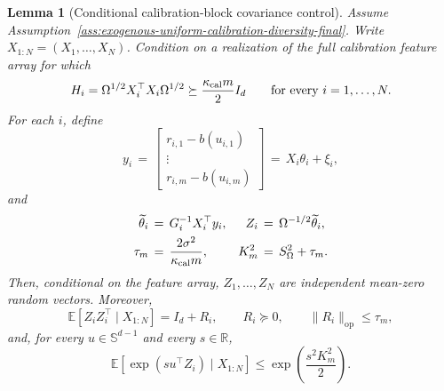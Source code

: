 \documentclass{article} %
\newtheorem{lemma}[theorem]{Lemma}
\begin{document}
\begin{lemma}[Conditional calibration-block covariance control]
\label{lem:calibration-block-covariance-control-final}
Assume Assumption~\ref{ass:exogenous-uniform-calibration-diversity-final}.
Write \(X_{1:N}=(X_1,\ldots,X_N)\).
Condition on a realization of the full calibration feature array for which
\begin{equation}
H_i=\Omega^{1/2}X_i^\top X_i\Omega^{1/2}
\succeq
\frac{\kappa_{\rm cal}m}{2}I_d
\qquad
\text{for every }i=1,\ldots,N.
\end{equation}
For each \(i\), define
\begin{equation}
y_i
\,=\,
\begin{bmatrix}
r_{i,1}-b(u_{i,1})\\
\vdots\\
r_{i,m}-b(u_{i,m})
\end{bmatrix}
\,=\,
X_i\theta_i+\xi_i,
\end{equation}
and
\begin{equation}
\begin{aligned}
\widetilde\theta_i
&\,=\,
G_i^{-1}X_i^\top y_i,
&
Z_i
&\,=\,
\Omega^{-1/2}\widetilde\theta_i,
\\
\tau_m
&\,=\,
\frac{2\sigma^2}{\kappa_{\rm cal}m},
&
K_m^2
&\,=\,
S_\Omega^2+\tau_m.
\end{aligned}
\end{equation}
Then, conditional on the feature array, \(Z_1,\ldots,Z_N\) are independent
mean-zero random vectors.  Moreover,
\begin{equation}
\mathbb{E}[Z_iZ_i^\top\mid X_{1:N}]=I_d+R_i,
\qquad
R_i\succeq0,
\qquad
\|R_i\|_{\mathrm{op}}\leq\tau_m,
\end{equation}
and, for every \(u\in\mathbb{S}^{d-1}\) and every \(s\in\mathbb{R}\),
\begin{equation}
\mathbb{E}\!\left[
\exp(su^\top Z_i)\mid X_{1:N}
\right]
\leq
\exp\!\left(\frac{s^2K_m^2}{2}\right).
\end{equation}
\end{lemma}
\end{document}
